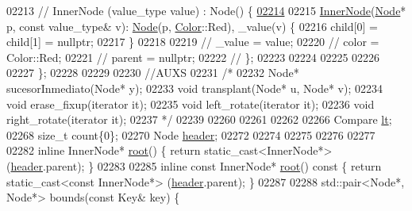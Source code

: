 \begin{DoxyCode}
02213     \textcolor{comment}{// InnerNode (value\_type value) : Node() \{}
\hypertarget{map3_8h_source_l02214}{}\hyperlink{structaed2_1_1map_1_1InnerNode_a107b0394e0bdc66c7b384c50121e9c21_a107b0394e0bdc66c7b384c50121e9c21}{02214}     
02215     \hyperlink{structaed2_1_1map_1_1InnerNode}{InnerNode}(\hyperlink{structaed2_1_1map_1_1Node}{Node}* p, \textcolor{keyword}{const} value\_type& v): \hyperlink{structaed2_1_1map_1_1Node}{Node}(p, \hyperlink{classaed2_1_1map_a6d62a415a4b9d320b30cada4ebcf9f5b_a6d62a415a4b9d320b30cada4ebcf9f5b}{Color}::Red), \_value(v) \{
02216         child[0] = child[1] = \textcolor{keyword}{nullptr};
02217     \}
02218         
02219     \textcolor{comment}{//  \_value = value;}
02220     \textcolor{comment}{//  color = Color::Red;}
02221   \textcolor{comment}{//       parent = nullptr;}
02222   \textcolor{comment}{//       \};}
02223 
02224 
02225         
02226 
02227     \};
02228 
02229 
02230     \textcolor{comment}{//AUXS}
02231     \textcolor{comment}{/*}
02232 \textcolor{comment}{    Node* sucesorInmediato(Node* y);    }
02233 \textcolor{comment}{    void transplant(Node* u, Node* v);}
02234 \textcolor{comment}{    void erase\_fixup(iterator it);}
02235 \textcolor{comment}{    void left\_rotate(iterator it);}
02236 \textcolor{comment}{    void right\_rotate(iterator it);}
02237 \textcolor{comment}{    */}
02239 
02260 
02261 
02262 
02266     Compare \hyperlink{classaed2_1_1map_a0e5be36fae0693e4665bd2a615e7550a_a0e5be36fae0693e4665bd2a615e7550a}{lt};
02268     \textcolor{keywordtype}{size\_t} count\{0\};
02270     Node \hyperlink{classaed2_1_1map_a92d93f905c8ad73fba18fdc7e8915cce_a92d93f905c8ad73fba18fdc7e8915cce}{header};
02272 
02274 
02275 
02276 
02277 
02282     \textcolor{keyword}{inline} InnerNode* \hyperlink{classaed2_1_1map_a07ab50eda249a57858a34037d4c4c7b2_a07ab50eda249a57858a34037d4c4c7b2}{root}() \{ \textcolor{keywordflow}{return} \textcolor{keyword}{static\_cast<}InnerNode*\textcolor{keyword}{>}(\hyperlink{classaed2_1_1map_a92d93f905c8ad73fba18fdc7e8915cce_a92d93f905c8ad73fba18fdc7e8915cce}{header}.parent); \}
02283 
02285     \textcolor{keyword}{inline} \textcolor{keyword}{const} InnerNode* \hyperlink{classaed2_1_1map_a07ab50eda249a57858a34037d4c4c7b2_a07ab50eda249a57858a34037d4c4c7b2}{root}()\textcolor{keyword}{ const }\{ \textcolor{keywordflow}{return} \textcolor{keyword}{static\_cast<}\textcolor{keyword}{const }InnerNode*\textcolor{keyword}{>}
      (\hyperlink{classaed2_1_1map_a92d93f905c8ad73fba18fdc7e8915cce_a92d93f905c8ad73fba18fdc7e8915cce}{header}.parent); \}
02287 
02288     std::pair<Node*, Node*> bounds(\textcolor{keyword}{const} Key& key) \{

\end{DoxyCode}
